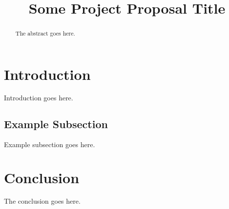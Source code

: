 \documentclass[conference]{IEEEtran}
\begin{document}
\title{Some Project Proposal Title}

\author{

}

\maketitle

\begin{abstract}
The abstract goes here.
\end{abstract}

\section{Introduction}
Introduction goes here.

\subsection{Example Subsection}
Example subsection goes here.

\section{Conclusion}
The conclusion goes here.

\end{document}
